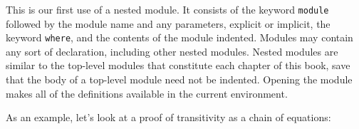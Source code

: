 \begin{fence}
\begin{code}
%
\>[2]%
\>[241I]\AgdaSymbol{:}\AgdaSpace{}%
\AgdaSpace{}%
\AgdaSymbol{(}\AgdaSpace{}%
\AgdaSymbol{:}\AgdaSpace{}%
\AgdaSymbol{)}\<%
\\
\>[241I][@{}l@{\AgdaIndent{0}}]%
\>[6]\AgdaComment{-----}\<%
\\
\>[2][@{}l@{\AgdaIndent{0}}]%
\>[4]\AgdaSpace{}%
\AgdaSpace{}%
\AgdaSpace{}%
\<%
\\
%
\>[2]\AgdaSpace{}%
%
\>[7]\AgdaSymbol{=}%
\>[10]\<%
\\
%
\\[\AgdaEmptyExtraSkip]%
\>[0]\AgdaSpace{}%
\<%
\end{code}
\end{fence}

This is our first use of a nested module. It consists of the keyword
\texttt{module} followed by the module name and any parameters, explicit
or implicit, the keyword \texttt{where}, and the contents of the module
indented. Modules may contain any sort of declaration, including other
nested modules. Nested modules are similar to the top-level modules that
constitute each chapter of this book, save that the body of a top-level
module need not be indented. Opening the module makes all of the
definitions available in the current environment.

As an example, let's look at a proof of transitivity as a chain of
equations:


